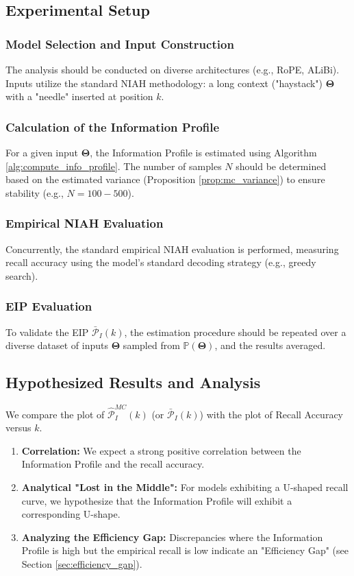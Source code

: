 \documentclass{article}
\theoremstyle{definition}
\begin{document}
\subsection{Experimental Setup}

\subsubsection{Model Selection and Input Construction}
The analysis should be conducted on diverse architectures (e.g., RoPE, ALiBi). Inputs utilize the standard NIAH methodology: a long context ("haystack") $\mathbf{\Theta}$ with a "needle" inserted at position $k$.

\subsubsection{Calculation of the Information Profile}
For a given input $\mathbf{\Theta}$, the Information Profile is estimated using Algorithm \ref{alg:compute_info_profile}. The number of samples $N$ should be determined based on the estimated variance (Proposition \ref{prop:mc_variance}) to ensure stability (e.g., $N=100-500$).

\subsubsection{Empirical NIAH Evaluation}
Concurrently, the standard empirical NIAH evaluation is performed, measuring recall accuracy using the model's standard decoding strategy (e.g., greedy search).

\subsubsection{EIP Evaluation}
To validate the EIP $\bar{\mathcal{P}}_I(k)$, the estimation procedure should be repeated over a diverse dataset of inputs $\mathbf{\Theta}$ sampled from $\mathbb{P}(\mathbf{\Theta})$, and the results averaged.

\subsection{Hypothesized Results and Analysis}
We compare the plot of $\hat{\mathcal{P}}_I^{MC}(k)$ (or $\bar{\mathcal{P}}_I(k)$) with the plot of Recall Accuracy versus $k$.

\begin{enumerate}
    \item \textbf{Correlation:} We expect a strong positive correlation between the Information Profile and the recall accuracy.
    \item \textbf{Analytical "Lost in the Middle":} For models exhibiting a U-shaped recall curve, we hypothesize that the Information Profile will exhibit a corresponding U-shape.
    \item \textbf{Analyzing the Efficiency Gap:} Discrepancies where the Information Profile is high but the empirical recall is low indicate an "Efficiency Gap" (see Section \ref{sec:efficiency_gap}).
\end{enumerate}
\end{document}
